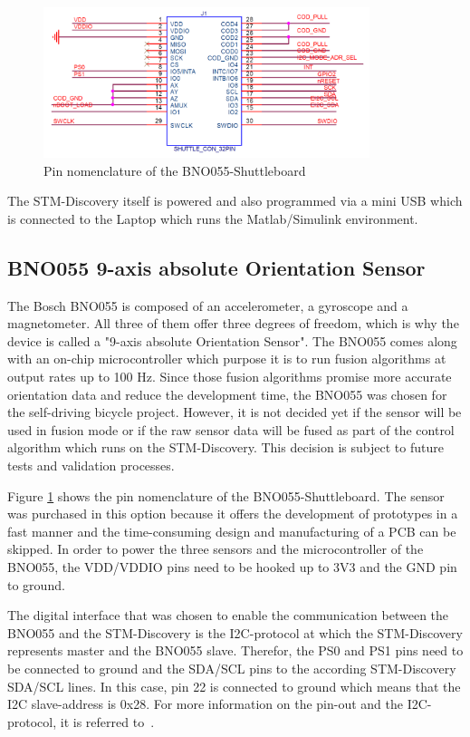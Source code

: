 \documentclass[a4paper]{article}
\begin{document}
\begin{figure}[htb]
	\centering
	\includegraphics*[trim=0mm 0mm 0mm 0mm,width=0.85\textwidth]{shuttlepins}
	\caption{Pin nomenclature of the BNO055-Shuttleboard ~\cite{shuttle1}}
	\label{shuttleboard}
\end{figure}

The STM-Discovery itself is powered and also programmed via a mini USB which is connected to the Laptop which runs the Matlab/Simulink environment.

\subsection{BNO055 9-axis absolute Orientation Sensor}
\label{eyetosee}
The Bosch BNO055 is composed of an accelerometer, a gyroscope and a magnetometer. All three of them offer three degrees of freedom, which is why the device is called a "9-axis absolute Orientation Sensor". The BNO055 comes along with an on-chip microcontroller which purpose it is to run fusion algorithms at output rates up to 100 Hz. Since those fusion algorithms promise more accurate orientation data and reduce the development time, the BNO055 was chosen for the self-driving bicycle project. However, it is not decided yet if the sensor will be used in fusion mode or if the raw sensor data will be fused as part of the control algorithm which runs on the STM-Discovery. This decision is subject to future tests and validation processes.     

\bigskip
 
Figure \ref{shuttleboard} shows the pin nomenclature of the BNO055-Shuttleboard. The sensor was purchased in this option because it offers the development of prototypes in a fast manner and the time-consuming design and manufacturing of a PCB can be skipped. In order to power the three sensors and the microcontroller of the BNO055, the VDD/VDDIO pins need to be hooked up to 3V3 and the GND pin to ground. 


The digital interface that was chosen to enable the communication between the BNO055 and the STM-Discovery is the I2C-protocol at which the STM-Discovery represents master and the BNO055 slave. Therefor, the PS0 and PS1 pins need to be connected to ground and the SDA/SCL pins to the according STM-Discovery SDA/SCL lines. In this case, pin 22 is connected to ground which means that the I2C slave-address is 0x28. For more information on the pin-out and the I2C-protocol, it is referred to~\cite{BNO1}.      
\end{document}
